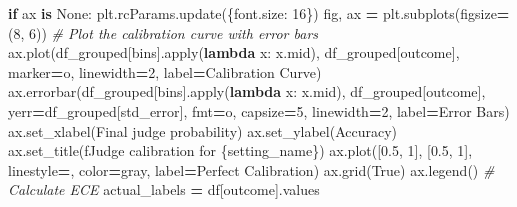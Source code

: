 \documentclass[
]{article}
\newenvironment{Shaded}{\begin{snugshade}}{\end{snugshade}}
\newcommand{\BuiltInTok}[1]{#1}
\newcommand{\CommentTok}[1]{\textcolor[rgb]{0.56,0.35,0.01}{\textit{#1}}}
\newcommand{\ControlFlowTok}[1]{\textcolor[rgb]{0.13,0.29,0.53}{\textbf{#1}}}
\newcommand{\DecValTok}[1]{\textcolor[rgb]{0.00,0.00,0.81}{#1}}
\newcommand{\FloatTok}[1]{\textcolor[rgb]{0.00,0.00,0.81}{#1}}
\newcommand{\KeywordTok}[1]{\textcolor[rgb]{0.13,0.29,0.53}{\textbf{#1}}}
\newcommand{\NormalTok}[1]{#1}
\newcommand{\OperatorTok}[1]{\textcolor[rgb]{0.81,0.36,0.00}{\textbf{#1}}}
\newcommand{\SpecialCharTok}[1]{\textcolor[rgb]{0.00,0.00,0.00}{#1}}
\newcommand{\SpecialStringTok}[1]{\textcolor[rgb]{0.31,0.60,0.02}{#1}}
\newcommand{\StringTok}[1]{\textcolor[rgb]{0.31,0.60,0.02}{#1}}
\newcommand{\VariableTok}[1]{\textcolor[rgb]{0.00,0.00,0.00}{#1}}
\begin{document}
\begin{Shaded}
\begin{Highlighting}[]
    \ControlFlowTok{if}\NormalTok{ ax }\KeywordTok{is} \VariableTok{None}\NormalTok{:}
\NormalTok{        plt.rcParams.update(\{}\StringTok{\textquotesingle{}font.size\textquotesingle{}}\NormalTok{: }\DecValTok{16}\NormalTok{\})}
\NormalTok{        fig, ax }\OperatorTok{=}\NormalTok{ plt.subplots(figsize}\OperatorTok{=}\NormalTok{(}\DecValTok{8}\NormalTok{, }\DecValTok{6}\NormalTok{))}
    \CommentTok{\# Plot the calibration curve with error bars}
\NormalTok{    ax.plot(df\_grouped[}\StringTok{\textquotesingle{}bins\textquotesingle{}}\NormalTok{].}\BuiltInTok{apply}\NormalTok{(}\KeywordTok{lambda}\NormalTok{ x: x.mid), df\_grouped[}\StringTok{\textquotesingle{}outcome\textquotesingle{}}\NormalTok{], marker}\OperatorTok{=}\StringTok{\textquotesingle{}o\textquotesingle{}}\NormalTok{, linewidth}\OperatorTok{=}\DecValTok{2}\NormalTok{, label}\OperatorTok{=}\StringTok{\textquotesingle{}Calibration Curve\textquotesingle{}}\NormalTok{)}
\NormalTok{    ax.errorbar(df\_grouped[}\StringTok{\textquotesingle{}bins\textquotesingle{}}\NormalTok{].}\BuiltInTok{apply}\NormalTok{(}\KeywordTok{lambda}\NormalTok{ x: x.mid), df\_grouped[}\StringTok{\textquotesingle{}outcome\textquotesingle{}}\NormalTok{], yerr}\OperatorTok{=}\NormalTok{df\_grouped[}\StringTok{\textquotesingle{}std\_error\textquotesingle{}}\NormalTok{], fmt}\OperatorTok{=}\StringTok{\textquotesingle{}o\textquotesingle{}}\NormalTok{, capsize}\OperatorTok{=}\DecValTok{5}\NormalTok{, linewidth}\OperatorTok{=}\DecValTok{2}\NormalTok{, label}\OperatorTok{=}\StringTok{\textquotesingle{}Error Bars\textquotesingle{}}\NormalTok{)}
\NormalTok{    ax.set\_xlabel(}\StringTok{\textquotesingle{}Final judge probability\textquotesingle{}}\NormalTok{)}
\NormalTok{    ax.set\_ylabel(}\StringTok{\textquotesingle{}Accuracy\textquotesingle{}}\NormalTok{)}
\NormalTok{    ax.set\_title(}\SpecialStringTok{f\textquotesingle{}Judge calibration for }\SpecialCharTok{\{}\NormalTok{setting\_name}\SpecialCharTok{\}}\SpecialStringTok{\textquotesingle{}}\NormalTok{)}
\NormalTok{    ax.plot([}\FloatTok{0.5}\NormalTok{, }\DecValTok{1}\NormalTok{], [}\FloatTok{0.5}\NormalTok{, }\DecValTok{1}\NormalTok{], linestyle}\OperatorTok{=}\StringTok{\textquotesingle{}{-}{-}\textquotesingle{}}\NormalTok{, color}\OperatorTok{=}\StringTok{\textquotesingle{}gray\textquotesingle{}}\NormalTok{, label}\OperatorTok{=}\StringTok{\textquotesingle{}Perfect Calibration\textquotesingle{}}\NormalTok{)}
\NormalTok{    ax.grid(}\VariableTok{True}\NormalTok{)}
\NormalTok{    ax.legend()}
    \CommentTok{\# Calculate ECE}
\NormalTok{    actual\_labels }\OperatorTok{=}\NormalTok{ df[}\StringTok{\textquotesingle{}outcome\textquotesingle{}}\NormalTok{].values}

\end{Highlighting}
\end{Shaded}
\end{document}
